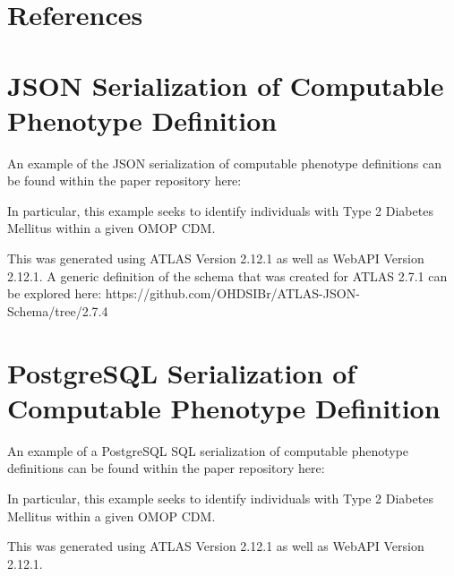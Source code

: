 \documentclass{juliacon}
\begin{document}
\section{References}


\appendix

\section{JSON Serialization of Computable Phenotype Definition}\label{appendix:json}

An example of the JSON serialization of computable phenotype definitions can be found within the paper repository here:

In particular, this example seeks to identify individuals with Type 2 Diabetes Mellitus within a given OMOP CDM.

This was generated using ATLAS Version 2.12.1 as well as 
WebAPI Version 2.12.1.
A generic definition of the schema that was created for ATLAS 2.7.1 can be explored here: https://github.com/OHDSIBr/ATLAS-JSON-Schema/tree/2.7.4

\section{PostgreSQL Serialization of Computable Phenotype Definition}\label{appendix:postgresql}

An example of a PostgreSQL SQL serialization of computable phenotype definitions can be found within the paper repository here:

In particular, this example seeks to identify individuals with Type 2 Diabetes Mellitus within a given OMOP CDM.

This was generated using ATLAS Version 2.12.1 as well as 
WebAPI Version 2.12.1.


\end{document}
